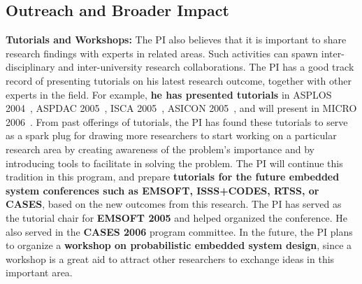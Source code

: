 \vspace{10pt}
\subsection{Outreach and Broader Impact}

{\bf Tutorials and Workshops:} The PI also believes that it is
important to share research findings with experts in related areas.
Such activities can spawn inter-disciplinary and inter-university
research collaborations. The PI has a good track record of
presenting tutorials on his latest research outcome, together with
other experts in the field. For example, \textbf{he has presented
tutorials} in ASPLOS 2004~\cite{xie:tutorial-asplos04}, ASPDAC
2005~\cite{xie:tutorial-aspdac05}, ISCA
2005~\cite{xie:tutorial-isca05}, ASICON
2005~\cite{xie:tutorial-asic05}, and will present in MICRO
2006~\cite{xie:tutorial-micro06}.  From past offerings of tutorials,
the PI has found these tutorials to serve as a spark plug for
drawing more researchers to start working on a particular research
area by creating awareness of the problem's importance and by
introducing tools to facilitate in solving the problem. The PI will
continue this tradition in this program, and prepare
\textbf{tutorials for the future embedded system conferences such as
EMSOFT, ISSS+CODES, RTSS, or CASES}, based on the new outcomes from
this research. The PI has served as the tutorial chair for
\textbf{EMSOFT 2005} and helped organized the conference. He also
served in the \textbf{CASES 2006} program committee. In the future,
the PI plans to organize a \textbf{workshop on probabilistic
embedded system design}, since a workshop is a great aid to attract
other researchers to exchange ideas in this important area.


